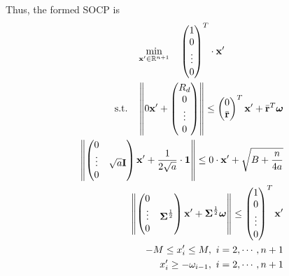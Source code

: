 \documentclass[12pt]{ftec2101}
\newcommand{\matr}[1]{\mathbf{#1}}
\newcommand{\vect}[1]{\mathbf{#1}}
\begin{document}
Thus, the formed SOCP is 
\begin{gather}
    \min_{\vect{x'} \in \mathbb{R}^{n+1}} \quad \begin{pmatrix}
        1 \\
        0 \\
        \vdots \\
        0
    \end{pmatrix}^T
    \cdot \vect{x'}\\
    \begin{aligned}
    \textup{s.t.} \quad  \left \Vert 0 \vect{x'} + 
    \begin{pmatrix}
        R_d\\
        0\\
        \vdots\\
        0
    \end{pmatrix} \right \Vert \leq
    \begin{pmatrix}
        0\\
        \bar{\vect{r}}
    \end{pmatrix}^T \vect{x'} + \bar{\vect{r}}^T \boldsymbol{\omega}\\
    \left \Vert 
    \begin{pmatrix}
        0 & \\
        \vdots & \sqrt{a} \matr{I} \\
        0 & 
    \end{pmatrix}\vect{x'} + \frac{1}{2\sqrt{a}} \cdot \vect{1} \right \Vert \leq 0 \cdot \vect{x'} + \sqrt{B+\frac{n}{4a}}\\
    \left \Vert
    \begin{pmatrix}
        0 & \\
        \vdots & \boldsymbol{\Sigma}^{\frac{1}{2}}\\
        0 & 
    \end{pmatrix} \vect{x'} + \boldsymbol{\Sigma}^{\frac{1}{2}} \boldsymbol{\omega} \right \Vert \leq
    \begin{pmatrix}
        1 \\
        0 \\
        \vdots \\
        0
    \end{pmatrix}^T \vect{x'}\\
    -M \leq x'_i \leq M,\ i=2,\cdots,n+1 \\
    x'_i \geq - \omega_{i - 1},\ i=2,\cdots,n+1
    \end{aligned}
\end{gather}

 
\end{document}
